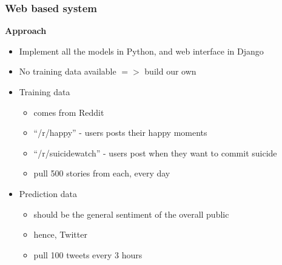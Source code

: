 \documentclass{beamer}
\begin{document}
    \begin{frame}
        \frametitle{Web based system}
        \begin{center}
            \textbf{Approach}
        \end{center}
        \begin{itemize}
            \item{Implement all the models in Python, and web interface in Django}
            \item{No training data available $=>$ build our own}
            \item{
            Training data
            \begin{itemize}
                \item{comes from Reddit}
                \item{``/r/happy'' - users posts their happy moments}
                \item{``/r/suicidewatch'' - users post when they want to commit suicide}
                \item{pull 500 stories from each, every day}
            \end{itemize}
            }
            \item{
            Prediction data
            \begin{itemize}
                \item{should be the general sentiment of the overall public}
                \item{hence, Twitter}
                \item{pull 100 tweets every 3 hours}
            \end{itemize}
            }
        \end{itemize}
    \end{frame}
    
\end{document}

